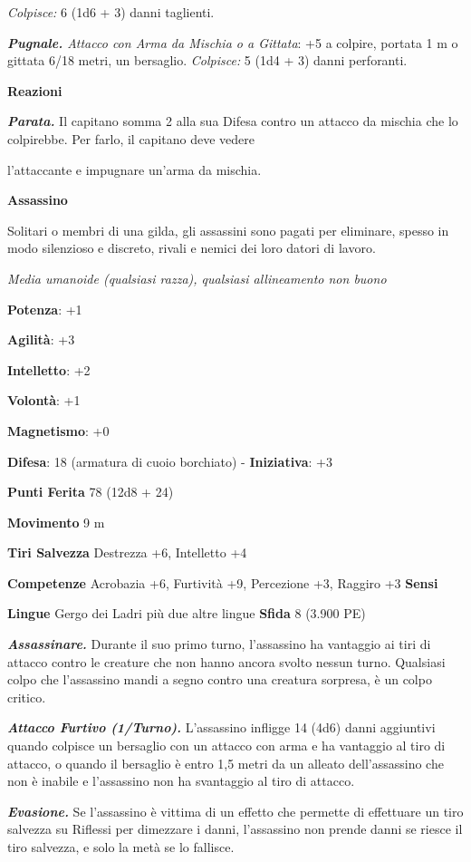 \begin{multicols}{2}
\emph{Colpisce:} 6 (1d6 + 3) danni taglienti.

\emph{\textbf{Pugnale.} Attacco con Arma da Mischia o a Gittata}: +5 a
colpire, portata 1 m o gittata 6/18 metri, un bersaglio.
\emph{Colpisce:} 5 (1d4 + 3) danni perforanti.

\textbf{Reazioni}

\emph{\textbf{Parata.}} Il capitano somma 2 alla sua Difesa contro un
attacco da mischia che lo colpirebbe. Per farlo, il capitano deve vedere

l'attaccante e impugnare un'arma da mischia.

\textbf{Assassino}

Solitari o membri di una gilda, gli assassini sono pagati per eliminare,
spesso in modo silenzioso e discreto, rivali e nemici dei loro datori di
lavoro.

\emph{Media umanoide (qualsiasi razza), qualsiasi allineamento non
buono}

\textbf{Potenza}: +1

\textbf{Agilità}: +3

\textbf{Intelletto}: +2

\textbf{Volontà}: +1

\textbf{Magnetismo}: +0

\textbf{Difesa}: 18 (armatura di cuoio borchiato) - \textbf{Iniziativa}: +3

\textbf{Punti Ferita} 78 (12d8 + 24)

\textbf{Movimento} 9 m

\textbf{Tiri Salvezza} Destrezza +6, Intelletto +4

\textbf{Competenze} Acrobazia +6, Furtività +9, Percezione +3, Raggiro +3
\textbf{Sensi} 

\textbf{Lingue} Gergo dei Ladri più due altre lingue \textbf{Sfida} 8
(3.900 PE)\smallskip

\emph{\textbf{Assassinare.}} Durante il suo primo turno, l'assassino ha
vantaggio ai tiri di attacco contro le creature che non hanno ancora
svolto nessun turno. Qualsiasi colpo che l'assassino mandi a segno
contro una creatura sorpresa, è un colpo critico.

\emph{\textbf{Attacco Furtivo (1/Turno).}} L'assassino infligge 14 (4d6)
danni aggiuntivi quando colpisce un bersaglio con un attacco con arma e
ha vantaggio al tiro di attacco, o quando il bersaglio è entro 1,5 metri
da un alleato dell'assassino che non è inabile e l'assassino non ha
svantaggio al tiro di attacco.

\emph{\textbf{Evasione.}} Se l'assassino è vittima di un effetto che
permette di effettuare un tiro salvezza su Riflessi per dimezzare i
danni, l'assassino non prende danni se riesce il tiro salvezza, e solo
la metà se lo fallisce.


\end{multicols}
